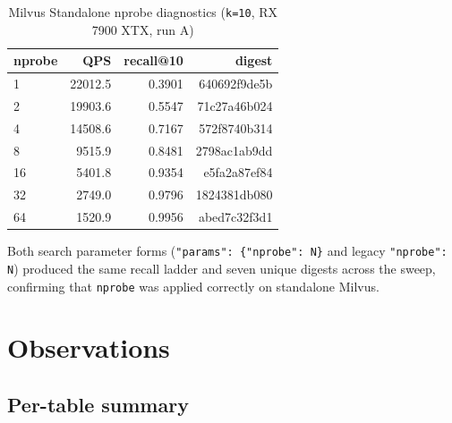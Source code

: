 \documentclass[11pt,a4paper]{article}
\begin{document}
\begin{table}[h]
\centering
\caption{Milvus Standalone nprobe diagnostics (\texttt{k=10}, RX 7900 XTX, run A)}
\begin{tabular}{@{}lrrr@{}}
\toprule
\textbf{nprobe} & \textbf{QPS} & \textbf{recall@10} & \textbf{digest} \\
\midrule
1  & 22012.5 & 0.3901 & 640692f9de5b \\
2  & 19903.6 & 0.5547 & 71c27a46b024 \\
4  & 14508.6 & 0.7167 & 572f8740b314 \\
8  &  9515.9 & 0.8481 & 2798ac1ab9dd \\
16 &  5401.8 & 0.9354 & e5fa2a87ef84 \\
32 &  2749.0 & 0.9796 & 1824381db080 \\
64 &  1520.9 & 0.9956 & abed7c32f3d1 \\
\bottomrule
\end{tabular}
\end{table}

Both search parameter forms (\texttt{"params": \{"nprobe": N\}} and legacy
\texttt{"nprobe": N}) produced the same recall ladder and seven unique digests across the
sweep, confirming that \texttt{nprobe} was applied correctly on standalone Milvus.

\section{Observations}

\subsection{Per-table summary}
\end{document}
